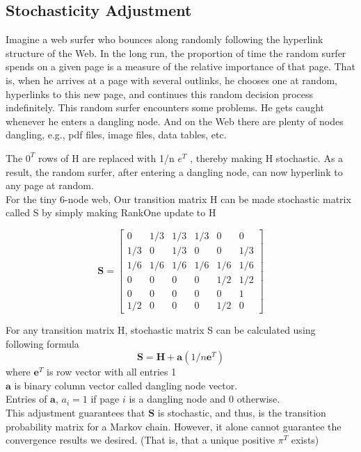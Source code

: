 \subsection{Stochasticity Adjustment}
\noindent Imagine a web surfer who bounces along randomly following the hyperlink structure of the Web. In the long run, the proportion of time the random surfer spends on a given page is a measure of the relative importance of that page. That is, when he arrives at a page with several outlinks, he chooses one at random, hyperlinks to this new page, and continues this random decision process indefinitely. This random surfer encounters some problems. He gets caught whenever he enters a dangling node. And on the Web there are plenty of nodes dangling, e.g., pdf files, image files, data tables, etc.

\noindent The $0^T$ rows of H are replaced with 1/n $e^T$ , thereby making H stochastic. As a result, the random surfer, after entering a dangling node, can now hyperlink to any page at random.\\

\noindent For the tiny 6-node web, Our transition matrix H can be made stochastic matrix called S by simply making RankOne update to H

$$
\mathbf{S}=\left[\begin{array}{cccccc}
	0 & 1 / 3 & 1 / 3 & 1 / 3 & 0 & 0 \\
	1 / 3 & 0 & 1 / 3 & 0 & 0 & 1 / 3 \\
	1/6 & 1/6 & 1/6 & 1/6 & 1/6 & 1/6 \\
	0 & 0 & 0 & 0 & 1 / 2 & 1 / 2 \\
	0 & 0 & 0 & 0 & 0 & 1 \\
	1 / 2 & 0 & 0 & 0 & 1 / 2 & 0
	\end{array}\right]
$$

\noindent For any transition matrix H, stochastic matrix S can be calculated using following formula\\
$$\mathbf{S}=\mathbf{H}+\mathbf{a}\left(1 / n \mathbf{e}^{T}\right)$$
where $\mathbf{e}^{T}$ is row vector with all entries 1\\
\noindent $\mathbf{a}$ is binary column vector called dangling node vector.\\
Entries of $\mathbf{a}$, $a_{i}=1$ if page $i$ is a dangling node and 0 otherwise.
\\
\noindent This adjustment guarantees that $\mathbf{S}$ is stochastic, and thus, is the transition probability matrix for a Markov chain. However, it alone cannot guarantee the convergence results we desired. (That is, that a unique positive $\pi^{T}$ exists) 

